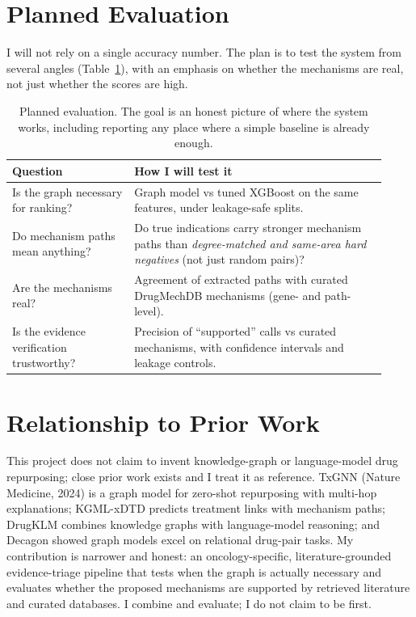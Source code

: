 \documentclass[11pt]{article}
\begin{document}
\section{Planned Evaluation}

I will not rely on a single accuracy number. The plan is to test the system from
several angles (Table~\ref{tab:eval}), with an emphasis on whether the mechanisms
are real, not just whether the scores are high.

\begin{table}[H]
\centering\small
\begin{tabular}{>{\raggedright\arraybackslash}p{0.30\linewidth} >{\raggedright\arraybackslash}p{0.62\linewidth}}
\toprule
\rowcolor{sriblue}\color{white}\textbf{Question} & \color{white}\textbf{How I will test it}\\
\midrule
\rowcolor{srirow} Is the graph necessary for ranking? & Graph model vs tuned XGBoost on the same features, under leakage-safe splits.\\
Do mechanism paths mean anything? & Do true indications carry stronger mechanism paths than \emph{degree-matched and same-area hard negatives} (not just random pairs)?\\
\rowcolor{srirow} Are the mechanisms real? & Agreement of extracted paths with curated DrugMechDB mechanisms (gene- and path-level).\\
Is the evidence verification trustworthy? & Precision of ``supported'' calls vs curated mechanisms, with confidence intervals and leakage controls.\\
\bottomrule
\end{tabular}
\caption{Planned evaluation. The goal is an honest picture of where the system
works, including reporting any place where a simple baseline is already enough.}
\label{tab:eval}
\end{table}

\section{Relationship to Prior Work}

This project does not claim to invent knowledge-graph or language-model drug
repurposing; close prior work exists and I treat it as reference. TxGNN (Nature
Medicine, 2024) is a graph model for zero-shot repurposing with multi-hop
explanations; KGML-xDTD predicts treatment links with mechanism paths; DrugKLM
combines knowledge graphs with language-model reasoning; and Decagon showed graph
models excel on relational drug-pair tasks. My contribution is narrower and honest:
an oncology-specific, literature-grounded evidence-triage pipeline that tests when
the graph is actually necessary and evaluates whether the proposed mechanisms are
supported by retrieved literature and curated databases. I combine and evaluate; I
do not claim to be first.
\end{document}
